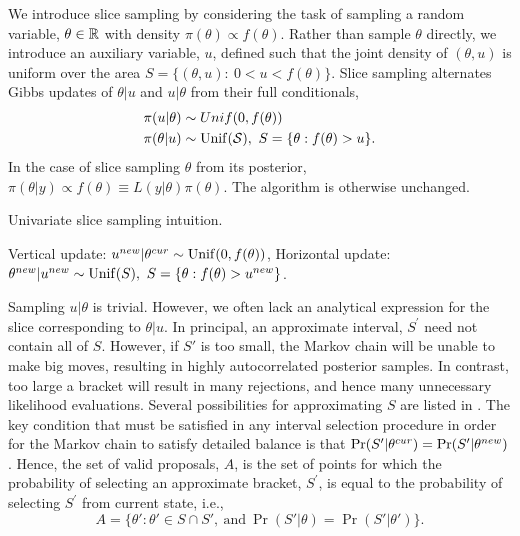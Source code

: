 We introduce slice sampling by considering the task of sampling a random variable, $ \theta\in\mathbb{R} $ with density $ \pi(\theta)\propto f(\theta) $.  Rather than sample $ \theta $ directly, we introduce an auxiliary variable, $ u $, defined such that the joint density of $ (\theta,u) $ is uniform over the area $ S = \lbrace (\theta,u):\ 0<u<f(\theta) \rbrace. $ Slice sampling alternates Gibbs updates of $ \theta|u $ and $ u|\theta $ from their full conditionals,
\begin{align*}
\pi(u|\theta) &\sim Unif(0,f(\theta)) \\
\pi(\theta|u) &\sim \mathrm{Unif}(\mathcal{S}),\ S = \lbrace \theta: f(\theta) > u\rbrace.
\end{align*}
In the case of slice sampling $ \theta $ from its posterior, $ \pi(\theta|y)\propto f(\theta) \equiv L(y|\theta)\pi(\theta) $. The algorithm is otherwise unchanged. 

\begin{algorithm}[htbp]
	\caption{Univariate slice sampling intuition.}\label{alg:univar_slice_intuition}
	\begin{algorithmic}[1]
		\State Vertical update: $ u^{new}|\theta^{cur} \sim \mathrm{Unif}(0,f(\theta))$,
		\State Horizontal update: $ \theta^{new}|u^{new} \sim \mathrm{Unif}(S),\ S = \lbrace \theta: f(\theta) > u^{new}\rbrace$.
		\EndProcedure
	\end{algorithmic}
\end{algorithm}

Sampling $ u|\theta $ is trivial. However, we often lack an analytical expression for the slice corresponding to $ \theta|u $. In principal, an approximate interval, $ S^\prime $ need not contain all of $ S $. However, if $ S' $ is too small, the Markov chain will be unable to make big moves, resulting in highly autocorrelated posterior samples. In contrast, too large a bracket will result in many rejections, and hence many unnecessary likelihood evaluations. Several possibilities for approximating $ S $ are listed in \cite{neal2003slice}. The key condition that must be satisfied in any interval selection procedure in order for the Markov chain to satisfy detailed balance is that $ \Pr(S'|\theta^{cur}) = \Pr(S'|\theta^{new}) $. Hence, the set of valid proposals, $ A $, is the set of points for which the probability of selecting an approximate bracket, $ S^\prime $, is equal to the probability of selecting $ S^\prime $ from current state, i.e., \[ A = \lbrace \theta': \theta' \in S\cap S',\ \mathrm{and}\ \Pr(S'|\theta) = \Pr(S'|\theta')\rbrace. \]

